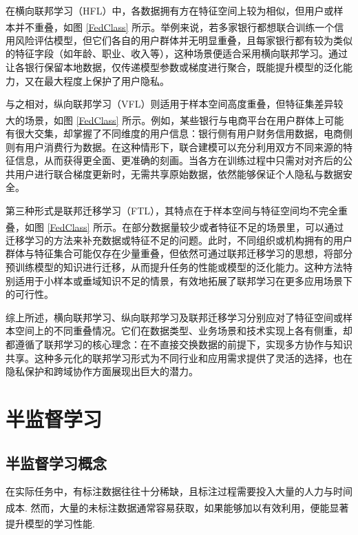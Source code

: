 \vspace{-0.35cm}
在横向联邦学习（HFL）中，各数据拥有方在特征空间上较为相似，但用户或样本并不重叠\textsuperscript{\cite{yang2019federated,liu2019communication}}，如图 \ref{FedClass} 所示。举例来说，若多家银行都想联合训练一个信用风险评估模型，但它们各自的用户群体并无明显重叠，且每家银行都有较为类似的特征字段（如年龄、职业、收入等），这种场景便适合采用横向联邦学习。通过让各银行保留本地数据，仅传递模型参数或梯度进行聚合，既能提升模型的泛化能力，又在最大程度上保护了用户隐私。

与之相对，纵向联邦学习（VFL）则适用于样本空间高度重叠，但特征集差异较大的场景\textsuperscript{\cite{liu2020secure,chen2020vafl}}，如图 \ref{FedClass} 所示。例如，某些银行与电商平台在用户群体上可能有很大交集，却掌握了不同维度的用户信息：银行侧有用户财务信用数据，电商侧则有用户消费行为数据。在这种情形下，联合建模可以充分利用双方不同来源的特征信息，从而获得更全面、更准确的刻画。当各方在训练过程中只需对对齐后的公共用户进行联合梯度更新时，无需共享原始数据，依然能够保证个人隐私与数据安全。

第三种形式是联邦迁移学习（FTL），其特点在于样本空间与特征空间均不完全重叠\textsuperscript{\cite{yang2019federated,chen2020vafl}}，如图 \ref{FedClass} 所示。在部分数据量较少或者特征不足的场景里，可以通过迁移学习的方法来补充数据或特征不足的问题。此时，不同组织或机构拥有的用户群体与特征集合可能仅存在少量重叠，但依然可通过联邦迁移学习的思想，将部分预训练模型的知识进行迁移，从而提升任务的性能或模型的泛化能力。这种方法特别适用于小样本或垂域知识不足的情景，有效地拓展了联邦学习在更多应用场景下的可行性。

综上所述，横向联邦学习、纵向联邦学习及联邦迁移学习分别应对了特征空间或样本空间上的不同重叠情况。它们在数据类型、业务场景和技术实现上各有侧重，却都遵循了联邦学习的核心理念：在不直接交换数据的前提下，实现多方协作与知识共享。这种多元化的联邦学习形式为不同行业和应用需求提供了灵活的选择，也在隐私保护和跨域协作方面展现出巨大的潜力。



\section{半监督学习}
\subsection{半监督学习概念}
在实际任务中，有标注数据往往十分稀缺，且标注过程需要投入大量的人力与时间成本\textsuperscript{\cite{chapelle2009semi}}. 然而，大量的未标注数据通常容易获取，如果能够加以有效利用，便能显著提升模型的学习性能\textsuperscript{\cite{zhu2005semi}}.

